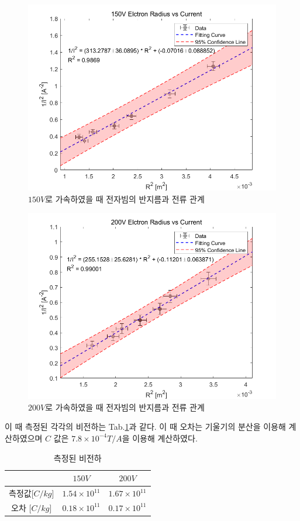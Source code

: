 \documentclass[%
 reprint,
 amsmath,amssymb,
 aps,
]{revtex4-2}
\begin{document}
\begin{figure}[htbp]
	\includegraphics[width = 0.95\linewidth]{150V.png}%
	\caption{\label{fig:150V}$150V$로 가속하였을 때 전자빔의 반지름과 전류 관계}
\end{figure}
\begin{figure}[htbp]
	\includegraphics[width = 0.95\linewidth]{200V.png}%
	\caption{\label{fig:200V}$200V$로 가속하였을 때 전자빔의 반지름과 전류 관계}
\end{figure}

이 때 측정된 각각의 비전하는 Tab.\ref{tab:findat}과 같다. 이 때 오차는 기울기의 분산을 이용해 계산하였으며 $C$ 값은 $7.8\times 10^{-4}T/A$을 이용해 계산하였다.
\begin{table}[]
\begin{tabular}{c|c|c} \hline \hline
 & $150V$ & $200V$ \\ \hline
측정값[$C/kg$] & $1.54\times 10^{11}$ & $1.67\times 10^{11}$ \\ \hline
오차 [$C/kg$]& $0.18\times 10^{11}$ &  $0.17\times 10^{11}$ \\ \hline \hline
\end{tabular}
\caption{\label{tab:findat}측정된 비전하}
\end{table}
\end{document}
